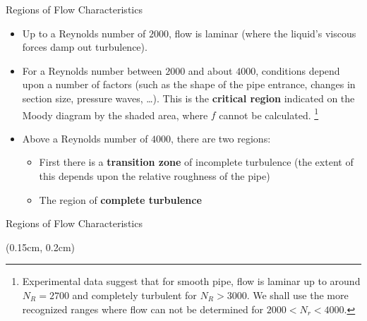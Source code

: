 \documentclass[9pt,xcolor={svgnames, x11names},professionalfonts]{beamer}
\begin{document}
\begin{frame}{Regions of Flow Characteristics}
	\begin{mini}{
			\begin{itemize}
				\item Up to a Reynolds number of $2000$, flow is laminar \newline(where the liquid's viscous forces damp out turbulence).\parb
				\item For a Reynolds number between $2000$ and about $4000$, conditions depend upon a number of factors (such as the
				      shape of the pipe entrance, changes in section size, pressure waves, \ldots). This is the \textbf{critical region} indicated
				      on the Moody diagram by the shaded area, where $f$ cannot be calculated.
				      \footnote{Experimental data suggest that for smooth pipe, flow is laminar up to around $N_R=2700$ and completely
				      	turbulent for $N_R > 3000$. We shall use the more recognized ranges where flow can not be determined for $2000 <
				      	N_r < 4000$.} \parb
				\item Above a Reynolds number of $4000$, there are two regions:
				      
				      \begin{itemize}
				      	\item First there is a \textbf{transition zone} of incomplete turbulence (the extent of this depends upon the relative roughness of
				      	      the pipe) \parm
				      	\item The region of \textbf{complete turbulence}
				      \end{itemize}
			\end{itemize}
		}
	\end{mini}
\end{frame}


\begin{frame}{Regions of Flow Characteristics}
	\begin{textblock*}{1\columnwidth}(0.15cm, 0.2cm)
	\end{textblock*}
\end{frame}
\end{document}
